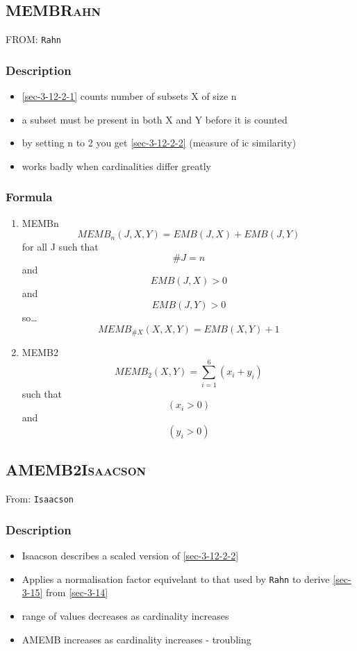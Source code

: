 \documentclass[11pt]{article}
\begin{document}
\subsection{MEMB\hfill{}\textsc{Rahn}}
\label{sec-3-12}
FROM: \texttt{Rahn}
\subsubsection{Description}
\label{sec-3-12-1}
\begin{itemize}
\item \ref{sec-3-12-2-1} counts number of subsets X of size n
\item a subset must be present in both X and Y before it is counted
\item by setting n to 2 you get \ref{sec-3-12-2-2} (measure of ic similarity)
\item works badly when cardinalities differ greatly
\end{itemize}

\subsubsection{Formula}
\label{sec-3-12-2}
\begin{enumerate}
\item MEMBn
\label{sec-3-12-2-1}
$$ MEMB_{n} \left( J,X,Y \right) = EMB \left( J,X \right) + EMB \left( J,Y \right)  $$
for all J such that
$$ \# J = n $$
and
$$ EMB \left( J,X \right) > 0 $$
and 
$$ EMB \left( J,Y \right) > 0 $$
so\ldots{}
$$ MEMB_{\#X}\left( X,X,Y \right)=EMB\left( X,Y \right) + 1 $$
\item MEMB2
\label{sec-3-12-2-2}
$$ MEMB_{2}\left(X,Y\right)=\sum_{i=1}^{6}\left(x_{i}+y_{i}\right) $$
such that $$ \left(x_{i}>0\right) $$ and $$ \left(y_{i}>0\right) $$
\end{enumerate}

\subsection{AMEMB2\hfill{}\textsc{Isaacson}}
\label{sec-3-13}
From: \texttt{Isaacson}
\subsubsection{Description}
\label{sec-3-13-1}
\begin{itemize}
\item Isaacson describes a scaled version of \ref{sec-3-12-2-2}
\item Applies a normalisation factor equivelant to that used by \texttt{Rahn}
to derive \ref{sec-3-15} from \ref{sec-3-14}
\item range of values decreases as cardinality increases
\item AMEMB increases as cardinality increases - troubling
\end{itemize}
\end{document}
